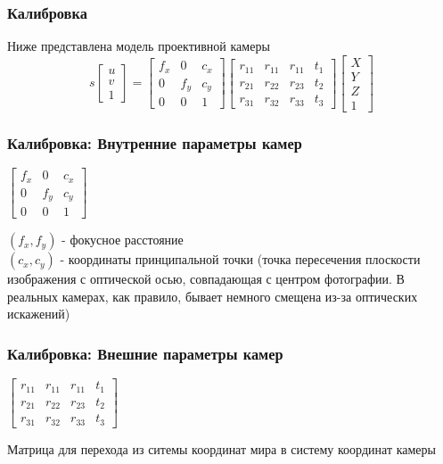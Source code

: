 \documentclass{beamer}
\begin{document}
		\begin{frame}
			\frametitle{Калибровка}
			
			Ниже представлена модель проективной камеры
			\begin{equation*}
			s
			\begin{bmatrix}
			u\\v\\1
			\end{bmatrix}
			=
			\begin{bmatrix}
			f_{x}&0&c_{x}\\
			0&f_{y}&c_{y}\\
			0&0&1
			\end{bmatrix}
			\begin{bmatrix}
			r_{11}&r_{11}&r_{11}&t_{1}\\
			r_{21}&r_{22}&r_{23}&t_{2}\\
			r_{31}&r_{32}&r_{33}&t_{3}
			\end{bmatrix}
			\begin{bmatrix}
			X\\Y\\Z\\1
			\end{bmatrix}
			\end{equation*}
		\end{frame}
		
		\begin{frame}
			\frametitle{Калибровка: Внутренние параметры камер}
			
			\begin{center}
			$
			\begin{bmatrix}
			f_{x}&0&c_{x}\\
			0&f_{y}&c_{y}\\
			0&0&1
			\end{bmatrix}
			$
			\end{center}
			$(f_{x},f_{y})$ - фокусное расстояние\\
			$(c_{x},c_{y})$ - координаты принципальной точки 
			(точка пересечения плоскости изображения с оптической осью, совпадающая с
			центром фотографии. В реальных камерах, как правило, бывает немного смещена
			из-за оптических искажений)
		\end{frame}
				
		\begin{frame}
			\frametitle{Калибровка: Внешние параметры камер}
			
			\begin{center}
			$
			\begin{bmatrix}
			r_{11}&r_{11}&r_{11}&t_{1}\\
			r_{21}&r_{22}&r_{23}&t_{2}\\
			r_{31}&r_{32}&r_{33}&t_{3}
			\end{bmatrix}
			$
			\end{center}
			Матрица для перехода из ситемы координат мира в систему координат камеры
		\end{frame}
					
\end{document}
